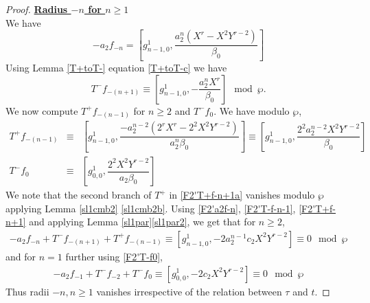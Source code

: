 \documentclass[10pt,a4paper]{amsart}
\begin{document}
\begin{proof}
\noindent\underline{\textbf{Radius $-n$ for $n\geq 1$}}\\
We have
\begin{equation}\label{F2'a2f-n}
-a_{2}f_{-n}=\left[g_{n-1,0}^{1}, \dfrac{a_{2}^{n}(X^{r}-X^2Y^{r-2})}{\beta_{0}}\right]
\end{equation}
Using Lemma \ref{T+toT-} equation \eqref{T+toT-c} we have
\begin{equation}\label{F2'T-f-n-1}
    T^{-}f_{-(n+1)} \equiv \left[g_{n-1,0}^{1}, -\dfrac{a_{2}^{n}X^{r}}{\beta_{0}}\right]\mod\wp.
\end{equation}
We now compute $T^{+}f_{-(n-1)}$ for $n\geq2$ and $T^{-}f_{0}$. We have modulo $\wp$,
\begin{eqnarray}\label{F2'T+f-n+1}
    T^{+}f_{-(n-1)}&\equiv& \left[g_{n-1,0}^{1}, \dfrac{-a_{2}^{n-2}(2^rX^{r}-2^2X^2Y^{r-2})}{a_{2}^n\beta_{0}}\right] \equiv\left[g_{n-1,0}^{1}, \dfrac{2^2a_{2}^{n-2}X^2Y^{r-2}}{\beta_{0}}\right]\label{F2'T+f-n+1a} \\
    T^{-}f_{0}&\equiv& \left[g_{0,0}^{1}, \dfrac{2^2X^2Y^{r-2}}{a_{2}\beta_{0}}\right] \label{F2'T-f0}
\end{eqnarray}
We note that the second branch of $T^{+}$ in \eqref{F2'T+f-n+1a} vanishes modulo $\wp$ applying Lemma \ref{sl1cmb2} \eqref{sl1cmb2b}. Using \eqref{F2'a2f-n}, \eqref{F2'T-f-n-1}, \eqref{F2'T+f-n+1} and applying Lemma \ref{sl1par}\eqref{sl1par2}, we get that for $n\geq 2$,
\begin{eqnarray*}
-a_{2}f_{-n}+T^{-}f_{-(n+1)}+T^{+}f_{-(n-1)} \equiv \left[g_{n-1,0}^{1}, -2a_{2}^{n-1}c_{2}X^2Y^{r-2} \right] 
\equiv 0 \mod\wp
\end{eqnarray*}
and for $n=1$ further using \eqref{F2'T-f0},\begin{eqnarray*} 
-a_{2}f_{-1}+T^{-}f_{-2}+T^{-}f_{0} \equiv \left[g_{0,0}^{1}, -2c_2X^2Y^{r-2}\right]
\equiv 0 \mod\wp
\end{eqnarray*}
Thus radii $-n, n\geq1$ vanishes irrespective of the relation between $\tau$ and $t$. 


\end{proof}
\end{document}
